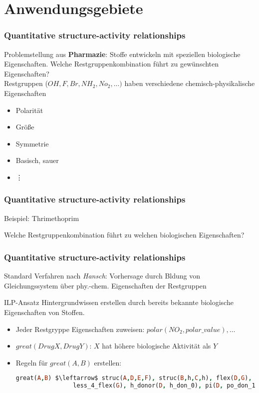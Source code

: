 \section{Anwendungsgebiete}
\begin{frame}
	\frametitle{Quantitative structure-activity relationships}
	Problemstellung aus \textbf{Pharmazie}: Stoffe entwickeln mit speziellen biologische Eigenschaften.
	Welche Restgruppenkombination führt zu gewünschten Eigenschaften?\\

	Restgruppen ($OH, F, Br, NH_2, No_2, \ldots)$ haben verschiedene
	chemisch-physikalische Eigenschaften
	\begin{itemize}
		\item Polarität
		\item Größe
		\item Symmetrie
		\item Basisch, sauer
		\item {\hspace{5pt}\vdots}
	\end{itemize}
\end{frame}
\begin{frame}
	\frametitle{Quantitative structure-activity relationships}
	\begin{block}{Beispiel: Thrimethoprim}
	\end{block}
	Welche Restgruppenkombination führt zu welchen biologischen Eigenschaften?
\end{frame}
\begin{frame}[fragile]
	\frametitle{Quantitative structure-activity relationships}
	Standard Verfahren nach \textit{Hansch}: Vorhersage durch Bldung von
	Gleichungssystem über phy.-chem. Eigenschaften der Restgruppen

	\begin{block}{ILP-Ansatz}
	Hintergrundwissen erstellen durch bereits bekannte biologische Eigenschaften
	von Stoffen.
	\begin{itemize}
		\item Jeder Restgryppe Eigenschaften zuweisen: $polar(NO_2, polar\_value), \ldots$
		\item $great(DrugX, DrugY)$: $X$ hat höhere biologische Aktivität als $Y$
		\item Regeln für $great(A,B)$ erstellen: 
			\begin{lstlisting}[language=prolog]
				great(A,B) $\leftarrow$ struc(A,D,E,F), struc(B,h,C,h), flex(D,G),
				less_4_flex(G), h_donor(D, h_don_0), pi(D, po_don_1).
			\end{lstlisting}
	\end{itemize}
	\end{block}
\end{frame}


